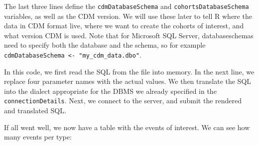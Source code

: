 \documentclass[]{article}
\newenvironment{Shaded}{\begin{snugshade}}{\end{snugshade}}
\newcommand{\KeywordTok}[1]{\textcolor[rgb]{0.13,0.29,0.53}{\textbf{#1}}}
\newcommand{\DataTypeTok}[1]{\textcolor[rgb]{0.13,0.29,0.53}{#1}}
\newcommand{\DecValTok}[1]{\textcolor[rgb]{0.00,0.00,0.81}{#1}}
\newcommand{\StringTok}[1]{\textcolor[rgb]{0.31,0.60,0.02}{#1}}
\newcommand{\OperatorTok}[1]{\textcolor[rgb]{0.81,0.36,0.00}{\textbf{#1}}}
\newcommand{\NormalTok}[1]{#1}
\begin{document}
The last three lines define the \texttt{cdmDatabaseSchema} and
\texttt{cohortsDatabaseSchema} variables, as well as the CDM version. We
will use these later to tell R where the data in CDM format live, where
we want to create the cohorts of interest, and what version CDM is used.
Note that for Microsoft SQL Server, databaseschemas need to specify both
the database and the schema, so for example
\texttt{cdmDatabaseSchema\ \textless{}-\ "my\_cdm\_data.dbo"}.

\begin{Shaded}
\end{Shaded}

In this code, we first read the SQL from the file into memory. In the
next line, we replace four parameter names with the actual values. We
then translate the SQL into the dialect appropriate for the DBMS we
already specified in the \texttt{connectionDetails}. Next, we connect to
the server, and submit the rendered and translated SQL.

If all went well, we now have a table with the events of interest. We
can see how many events per type:

\begin{Shaded}
\end{Shaded}
\end{document}

